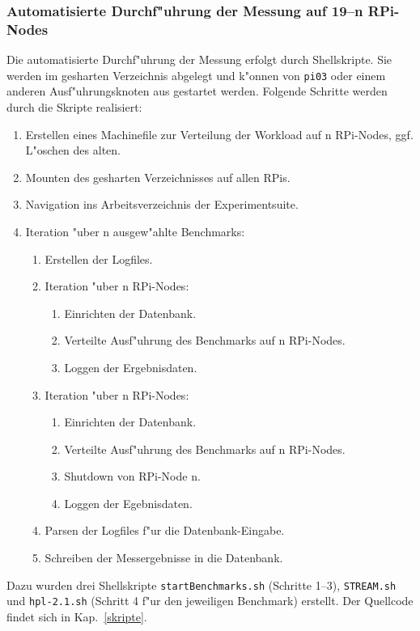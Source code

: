 \subsubsection{Automatisierte Durchf"uhrung der Messung auf 19--n RPi-Nodes} 

Die automatisierte Durchf"uhrung der Messung erfolgt durch Shellskripte. Sie werden im gesharten Verzeichnis abgelegt und k"onnen von \texttt{pi03} oder einem anderen Ausf"uhrungsknoten aus gestartet werden. Folgende Schritte werden durch die Skripte realisiert: 

\begin{enumerate}
	\item Erstellen eines Machinefile zur Verteilung der Workload auf n RPi-Nodes, ggf. L"oschen des alten.
	\item Mounten des gesharten Verzeichnisses auf allen RPis. 
	\item Navigation ins Arbeitsverzeichnis der Experimentsuite. 
	\item Iteration "uber n ausgew"ahlte Benchmarks: 
	\begin{enumerate}
		\item Erstellen der Logfiles. 
		\item Iteration "uber n RPi-Nodes:
		\begin{enumerate}
			\item Einrichten der Datenbank. 
			\item Verteilte Ausf"uhrung des Benchmarks auf n RPi-Nodes. 
			\item Loggen der Ergebnisdaten. 
		\end{enumerate}
		\item Iteration "uber n RPi-Nodes: 
		\begin{enumerate}
			\item Einrichten der Datenbank.
			\item Verteilte Ausf"uhrung des Benchmarks auf n RPi-Nodes. 
			\item Shutdown von RPi-Node n. 
			\item Loggen der Egebnisdaten.   
		\end{enumerate}
		\item Parsen der Logfiles f"ur die Datenbank-Eingabe. 
		\item Schreiben der Messergebnisse in die Datenbank. 
	\end{enumerate}
\end{enumerate}
\noindent
Dazu wurden drei Shellskripte \texttt{startBenchmarks.sh} (Schritte 1--3), \texttt{STREAM.sh} und \texttt{hpl-2.1.sh} (Schritt 4 f"ur den jeweiligen Benchmark) erstellt. Der Quellcode findet sich in \mbox{Kap. \ref{skripte}}.

